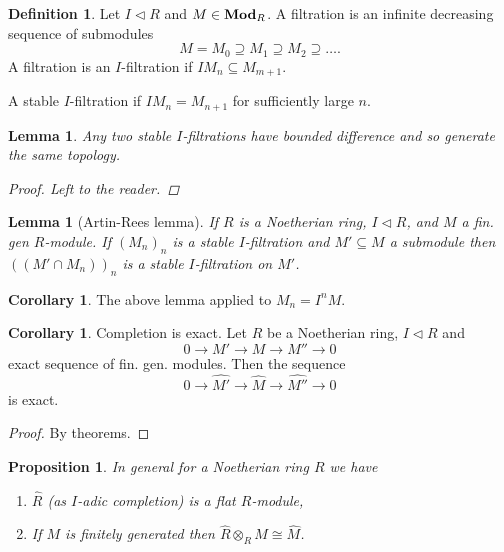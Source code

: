\documentclass{article}
\DeclareMathOperator{\modules}{{\bf Mod}}
\newcommand{\ideal}{\triangleleft}
\newtheorem{lemma}[theorem]{Lemma}
\newtheorem{proposition}[theorem]{Proposition}
\theoremstyle{definition}
\newtheorem{definition}[theorem]{Definition}
\newtheorem{corollary}[theorem]{Corollary}
\begin{document}
\begin{definition}
    Let \(I\ideal R\) and \(M\in\modules_{R}\). A filtration is an infinite
    decreasing sequence of submodules
    \[
        M=M_{0}\supseteq M_{1}\supseteq M_{2}\supseteq\ldots.
    \]
    A filtration is an \(I\)-filtration if \(IM_{n}\subseteq M_{m+1}\).

    A stable \(I\)-filtration if \(IM_{n}=M_{n+1}\) for sufficiently large
    \(n\).
\end{definition}

\begin{lemma}
    Any two stable \(I\)-filtrations have bounded difference and so generate the
    same topology.

    \begin{proof}
        Left to the reader.
    \end{proof}
\end{lemma}

\begin{lemma}[Artin-Rees lemma]
    If \(R\) is a Noetherian ring, \(I\ideal R\), and \(M\) a fin. gen
    \(R\)-module. If \((M_{n})_{n}\) is a stable \(I\)-filtration and
    \(M'\subseteq M\) a submodule then \(((M'\cap M_{n}))_{n}\) is a stable
    \(I\)-filtration on \(M'\).
\end{lemma}

\begin{corollary}
    The above lemma applied to \(M_{n}=I^{n}M\).
\end{corollary}

\begin{corollary}
    Completion is exact. Let \(R\) be a Noetherian ring, \(I\ideal R\) and
    \[
        0\to M'\to M\to M''\to 0
    \]
    exact sequence of fin. gen. modules. Then the sequence
    \[
        0\to\widehat{M'}\to\widehat{M}\to\widehat{M''}\to 0
    \]
    is exact.

    \begin{proof}
        By theorems.
    \end{proof}
\end{corollary}

\begin{proposition}
    In general for a Noetherian ring \(R\) we have
    \begin{enumerate}
        \item \(\widehat{R}\) (as \(I\)-adic completion) is a flat \(R\)-module,
        \item If \(M\) is finitely generated then
              \(\widehat{R}\otimes_{R}M\cong\widehat{M}\).
    \end{enumerate}
\end{proposition}
\end{document}

